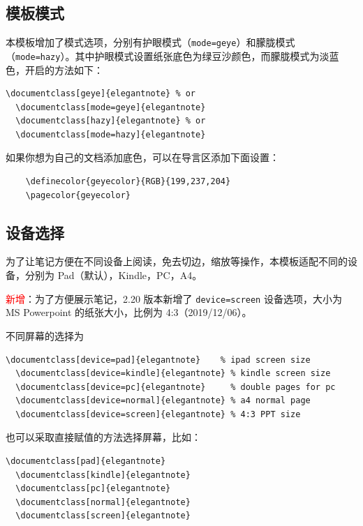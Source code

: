\documentclass[cn,hazy,blue,14pt,screen]{elegantnote}
\begin{document}
\subsection{模板模式}

本模板增加了模式选项，分别有护眼模式（\lstinline{mode=geye}）和朦胧模式（\lstinline{mode=hazy}）。其中护眼模式设置纸张底色为绿豆沙颜色，而朦胧模式为淡蓝色，开启的方法如下：
\begin{lstlisting}[frame=none]  
  \documentclass[geye]{elegantnote} % or
  \documentclass[mode=geye]{elegantnote}
  \documentclass[hazy]{elegantnote} % or
  \documentclass[mode=hazy]{elegantnote}
\end{lstlisting}

\begin{remark}
  如果你想为自己的文档添加底色，可以在导言区添加下面设置：
  \begin{lstlisting}
    \definecolor{geyecolor}{RGB}{199,237,204}
    \pagecolor{geyecolor}
  \end{lstlisting}
\end{remark}


\subsection{设备选择}

为了让笔记方便在不同设备上阅读，免去切边，缩放等操作，本模板适配不同的设备，分别为 Pad（默认），Kindle，PC，A4。

\textcolor{red}{\kaishu 新增}：为了方便展示笔记，2.20 版本新增了 \lstinline{device=screen} 设备选项，大小为 MS Powerpoint 的纸张大小，比例为 4:3（2019/12/06）。

不同屏幕的选择为
\begin{lstlisting}[frame=none]  
  \documentclass[device=pad]{elegantnote}    % ipad screen size
  \documentclass[device=kindle]{elegantnote} % kindle screen size
  \documentclass[device=pc]{elegantnote}     % double pages for pc 
  \documentclass[device=normal]{elegantnote} % a4 normal page
  \documentclass[device=screen]{elegantnote} % 4:3 PPT size
\end{lstlisting}
\begin{note}
也可以采取直接赋值的方法选择屏幕，比如：
\end{note}
\begin{lstlisting}[frame=none]  
  \documentclass[pad]{elegantnote}
  \documentclass[kindle]{elegantnote}
  \documentclass[pc]{elegantnote}
  \documentclass[normal]{elegantnote}
  \documentclass[screen]{elegantnote}
\end{lstlisting}
\end{document}
